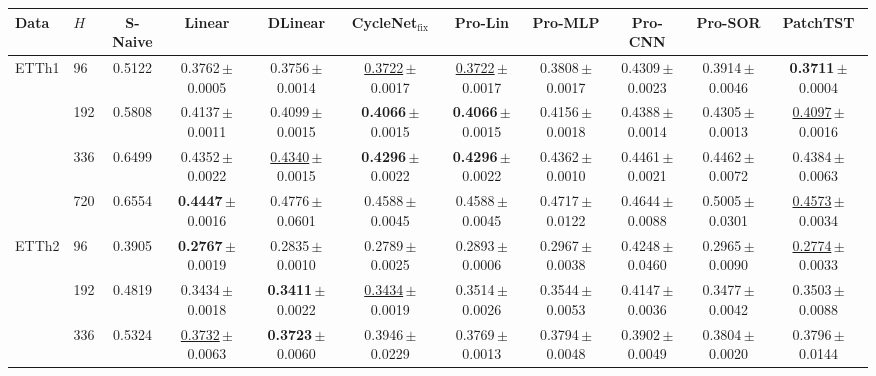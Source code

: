 \begin{tabular}{llccccccccc}
\toprule
\textbf{Data} & $H$ & \textbf{S-Naive} & \textbf{Linear} & \textbf{DLinear} & \textbf{CycleNet$_{\text{fix}}$} & \textbf{Pro-Lin} & \textbf{Pro-MLP} & \textbf{Pro-CNN} & \textbf{Pro-SOR} & \textbf{PatchTST} \\
\midrule
\multirow{4}{*}{ETTh1} & 96 & 0.5122 & 0.3762\,{\tiny$\pm$0.0005} & 0.3756\,{\tiny$\pm$0.0014} & \underline{0.3722}\,{\tiny$\pm$0.0017} & \underline{0.3722}\,{\tiny$\pm$0.0017} & 0.3808\,{\tiny$\pm$0.0017} & 0.4309\,{\tiny$\pm$0.0023} & 0.3914\,{\tiny$\pm$0.0046} & \textbf{0.3711}\,{\tiny$\pm$0.0004} \\
 & 192 & 0.5808 & 0.4137\,{\tiny$\pm$0.0011} & 0.4099\,{\tiny$\pm$0.0015} & \textbf{0.4066}\,{\tiny$\pm$0.0015} & \textbf{0.4066}\,{\tiny$\pm$0.0015} & 0.4156\,{\tiny$\pm$0.0018} & 0.4388\,{\tiny$\pm$0.0014} & 0.4305\,{\tiny$\pm$0.0013} & \underline{0.4097}\,{\tiny$\pm$0.0016} \\
 & 336 & 0.6499 & 0.4352\,{\tiny$\pm$0.0022} & \underline{0.4340}\,{\tiny$\pm$0.0015} & \textbf{0.4296}\,{\tiny$\pm$0.0022} & \textbf{0.4296}\,{\tiny$\pm$0.0022} & 0.4362\,{\tiny$\pm$0.0010} & 0.4461\,{\tiny$\pm$0.0021} & 0.4462\,{\tiny$\pm$0.0072} & 0.4384\,{\tiny$\pm$0.0063} \\
 & 720 & 0.6554 & \textbf{0.4447}\,{\tiny$\pm$0.0016} & 0.4776\,{\tiny$\pm$0.0601} & 0.4588\,{\tiny$\pm$0.0045} & 0.4588\,{\tiny$\pm$0.0045} & 0.4717\,{\tiny$\pm$0.0122} & 0.4644\,{\tiny$\pm$0.0088} & 0.5005\,{\tiny$\pm$0.0301} & \underline{0.4573}\,{\tiny$\pm$0.0034} \\
\midrule
\multirow{4}{*}{ETTh2} & 96 & 0.3905 & \textbf{0.2767}\,{\tiny$\pm$0.0019} & 0.2835\,{\tiny$\pm$0.0010} & 0.2789\,{\tiny$\pm$0.0025} & 0.2893\,{\tiny$\pm$0.0006} & 0.2967\,{\tiny$\pm$0.0038} & 0.4248\,{\tiny$\pm$0.0460} & 0.2965\,{\tiny$\pm$0.0090} & \underline{0.2774}\,{\tiny$\pm$0.0033} \\
 & 192 & 0.4819 & 0.3434\,{\tiny$\pm$0.0018} & \textbf{0.3411}\,{\tiny$\pm$0.0022} & \underline{0.3434}\,{\tiny$\pm$0.0019} & 0.3514\,{\tiny$\pm$0.0026} & 0.3544\,{\tiny$\pm$0.0053} & 0.4147\,{\tiny$\pm$0.0036} & 0.3477\,{\tiny$\pm$0.0042} & 0.3503\,{\tiny$\pm$0.0088} \\
 & 336 & 0.5324 & \underline{0.3732}\,{\tiny$\pm$0.0063} & \textbf{0.3723}\,{\tiny$\pm$0.0060} & 0.3946\,{\tiny$\pm$0.0229} & 0.3769\,{\tiny$\pm$0.0013} & 0.3794\,{\tiny$\pm$0.0048} & 0.3902\,{\tiny$\pm$0.0049} & 0.3804\,{\tiny$\pm$0.0020} & 0.3796\,{\tiny$\pm$0.0144} \\

\end{tabular}
